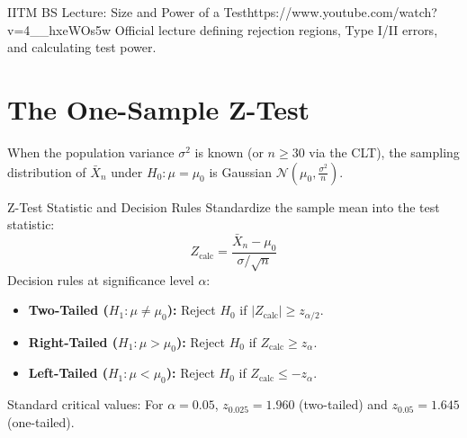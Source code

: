 \begin{videocard}{IITM BS Lecture: Size and Power of a Test}{https://www.youtube.com/watch?v=4__hxeWOs5w}
Official lecture defining rejection regions, Type I/II errors, and calculating test power.
\end{videocard}

\section{The One-Sample Z-Test}

When the population variance $\sigma^2$ is known (or $n \ge 30$ via the CLT), the sampling distribution of $\bar{X}_n$ under $H_0 \colon \mu = \mu_0$ is Gaussian $\mathcal{N}\left(\mu_0, \frac{\sigma^2}{n}\right)$.

\begin{formulabox}{Z-Test Statistic and Decision Rules}
Standardize the sample mean into the test statistic:
$$Z_{\text{calc}} = \frac{\bar{X}_n - \mu_0}{\sigma / \sqrt{n}}$$
Decision rules at significance level $\alpha$:
\begin{itemize}
    \item \textbf{Two-Tailed ($H_1 \colon \mu \neq \mu_0$):} Reject $H_0$ if $|Z_{\text{calc}}| \ge z_{\alpha/2}$.
    \item \textbf{Right-Tailed ($H_1 \colon \mu > \mu_0$):} Reject $H_0$ if $Z_{\text{calc}} \ge z_{\alpha}$.
    \item \textbf{Left-Tailed ($H_1 \colon \mu < \mu_0$):} Reject $H_0$ if $Z_{\text{calc}} \le -z_{\alpha}$.
\end{itemize}
Standard critical values: For $\alpha = 0.05$, $z_{0.025} = 1.960$ (two-tailed) and $z_{0.05} = 1.645$ (one-tailed).
\end{formulabox}

